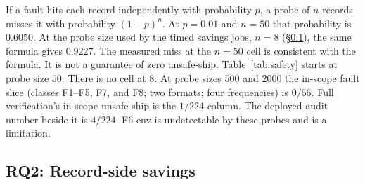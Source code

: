 \documentclass[letterpaper,twocolumn,10pt]{article}
\begin{document}
If a fault hits each record independently with probability $p$, a probe of $n$ records misses it with probability $(1-p)^{n}$.
At $p = 0.01$ and $n = 50$ that probability is
$0.6050$.
At the probe size used by the timed savings jobs, $n = 8$ (\S\ref{sec:rq2}), the same formula gives
$0.9227$.
The measured miss at the $n = 50$ cell is consistent with the formula.
It is not a guarantee of zero unsafe-ship.
Table~\ref{tab:safety} starts at probe size $50$.
There is no cell at $8$.
At probe sizes $500$ and $2000$ the in-scope fault slice (classes F1--F5, F7, and F8; two formats; four frequencies) is
$0/56$.
Full verification's in-scope unsafe-ship is the
$1/224$
column.
The deployed audit number beside it is
$4/224$.
F6-env is undetectable by these probes and is a limitation.

\subsection{RQ2: Record-side savings}
\label{sec:rq2}
\end{document}
